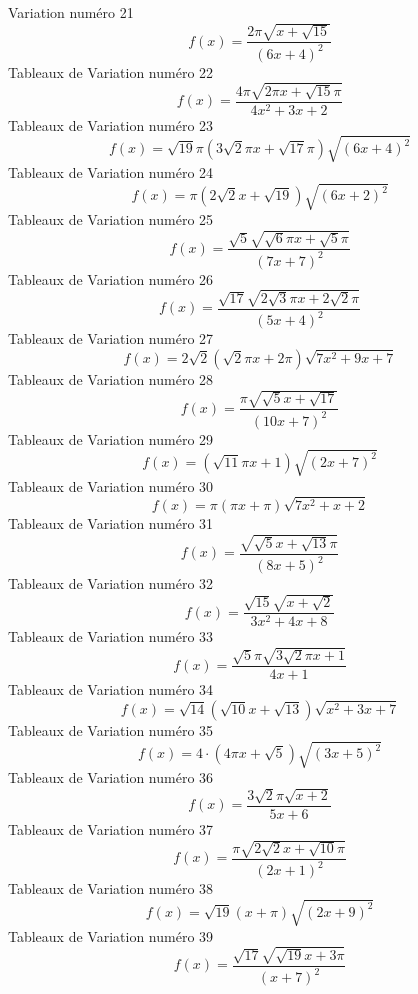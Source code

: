 \documentclass{article}
\begin{document}
Variation num\'ero 21 \[f(x) = \frac{2 \pi \sqrt{x + \sqrt{15}}}{\left(6 x + 4\right)^{2}}\]Tableaux de Variation num\'ero 22 \[f(x) = \frac{4 \pi \sqrt{2 \pi x + \sqrt{15} \pi}}{4 x^{2} + 3 x + 2}\]Tableaux de Variation num\'ero 23 \[f(x) = \sqrt{19} \pi \left(3 \sqrt{2} \pi x + \sqrt{17} \pi\right) \sqrt{\left(6 x + 4\right)^{2}}\]Tableaux de Variation num\'ero 24 \[f(x) = \pi \left(2 \sqrt{2} x + \sqrt{19}\right) \sqrt{\left(6 x + 2\right)^{2}}\]Tableaux de Variation num\'ero 25 \[f(x) = \frac{\sqrt{5} \sqrt{\sqrt{6} \pi x + \sqrt{5} \pi}}{\left(7 x + 7\right)^{2}}\]Tableaux de Variation num\'ero 26 \[f(x) = \frac{\sqrt{17} \sqrt{2 \sqrt{3} \pi x + 2 \sqrt{2} \pi}}{\left(5 x + 4\right)^{2}}\]Tableaux de Variation num\'ero 27 \[f(x) = 2 \sqrt{2} \left(\sqrt{2} \pi x + 2 \pi\right) \sqrt{7 x^{2} + 9 x + 7}\]Tableaux de Variation num\'ero 28 \[f(x) = \frac{\pi \sqrt{\sqrt{5} x + \sqrt{17}}}{\left(10 x + 7\right)^{2}}\]Tableaux de Variation num\'ero 29 \[f(x) = \left(\sqrt{11} \pi x + 1\right) \sqrt{\left(2 x + 7\right)^{2}}\]Tableaux de Variation num\'ero 30 \[f(x) = \pi \left(\pi x + \pi\right) \sqrt{7 x^{2} + x + 2}\]Tableaux de Variation num\'ero 31 \[f(x) = \frac{\sqrt{\sqrt{5} x + \sqrt{13} \pi}}{\left(8 x + 5\right)^{2}}\]Tableaux de Variation num\'ero 32 \[f(x) = \frac{\sqrt{15} \sqrt{x + \sqrt{2}}}{3 x^{2} + 4 x + 8}\]Tableaux de Variation num\'ero 33 \[f(x) = \frac{\sqrt{5} \pi \sqrt{3 \sqrt{2} \pi x + 1}}{4 x + 1}\]Tableaux de Variation num\'ero 34 \[f(x) = \sqrt{14} \left(\sqrt{10} x + \sqrt{13}\right) \sqrt{x^{2} + 3 x + 7}\]Tableaux de Variation num\'ero 35 \[f(x) = 4 \cdot \left(4 \pi x + \sqrt{5}\right) \sqrt{\left(3 x + 5\right)^{2}}\]Tableaux de Variation num\'ero 36 \[f(x) = \frac{3 \sqrt{2} \pi \sqrt{x + 2}}{5 x + 6}\]Tableaux de Variation num\'ero 37 \[f(x) = \frac{\pi \sqrt{2 \sqrt{2} x + \sqrt{10} \pi}}{\left(2 x + 1\right)^{2}}\]Tableaux de Variation num\'ero 38 \[f(x) = \sqrt{19} \left(x + \pi\right) \sqrt{\left(2 x + 9\right)^{2}}\]Tableaux de Variation num\'ero 39 \[f(x) = \frac{\sqrt{17} \sqrt{\sqrt{19} x + 3 \pi}}{\left(x + 7\right)^{2}}\]
\end{document}
